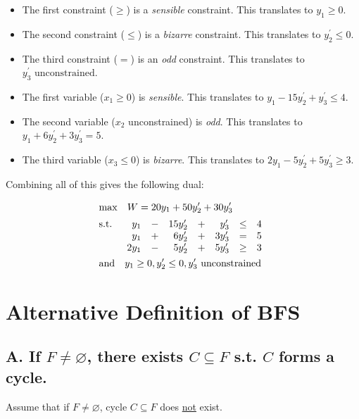 \documentclass[12pt]{article}
\begin{document}
\begin{itemize}
  \item The first constraint ($\geq$) is a \textit{sensible} constraint. This translates to $y_1 \geq 0$.
  \item The second constraint ($\leq$) is a \textit{bizarre} constraint. This translates to $y_2^\prime \leq 0$.
  \item The third constraint ($=$) is an \textit{odd} constraint. This translates to $y_3^\prime \text{ unconstrained}$.
\end{itemize}
\vspace{1mm}
\begin{itemize}
  \item The first variable ($x_1 \geq 0$) is \textit{sensible}. This translates to $y_1 - 15y_2^\prime + y_3^\prime \leq 4$.
  \item The second variable ($x_2$ unconstrained) is \textit{odd}. This translates to $y_1 + 6y_2^\prime + 3y_3^\prime = 5$.
  \item The third variable ($x_3 \leq 0$) is \textit{bizarre}. This translates to $2y_1 - 5y_2^\prime + 5y_3^\prime \geq 3$.
\end{itemize}

\noindent
Combining all of this gives the following dual:

\newpage
\begin{align*}
  &\mathrm{max} \quad W = 20y_1 + 50y_2^\prime + 30y_3^\prime \\[2pt]
  &\mathrm{s.t.} \quad 
  \begin{array}[t]{r c r c r c r}
      y_1 & - & 15y_2^\prime & + & y_3^\prime & \leq & 4 \\
      y_1 & + & 6y_2^\prime & + & 3y_3^\prime & = & 5 \\
      2y_1 & - & 5y_2^\prime & + & 5y_3^\prime & \geq & 3
  \end{array}\\
  &\mathrm{and} \quad y_1 \geq 0, y_2^\prime \leq 0, y_3^\prime \text{ unconstrained}
\end{align*}

%
%
\section{Alternative Definition of BFS}
\subsection{A. If $F \neq \varnothing$, there exists $C \subseteq F$ s.t. $C$ forms a cycle.}
Assume that if $F \neq \varnothing$, cycle $C \subseteq F$ does \underline{not} exist.
\end{document}
